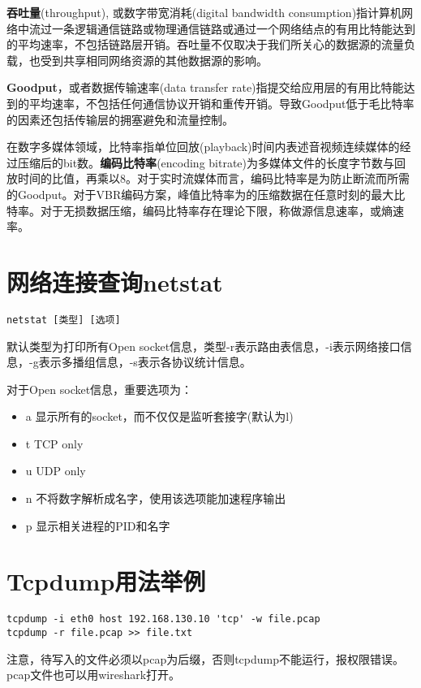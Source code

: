 \textbf{吞吐量}(throughput), 或数字带宽消耗(digital bandwidth consumption)指计算机网络中流过一条逻辑通信链路或物理通信链路或通过一个网络结点的有用比特能达到的平均速率，不包括链路层开销。吞吐量不仅取决于我们所关心的数据源的流量负载，也受到共享相同网络资源的其他数据源的影响。

\textbf{Goodput}，或者数据传输速率(data transfer rate)指提交给应用层的有用比特能达到的平均速率，不包括任何通信协议开销和重传开销。导致Goodput低于毛比特率的因素还包括传输层的拥塞避免和流量控制。

在数字多媒体领域，比特率指单位回放(playback)时间内表述音视频连续媒体的经过压缩后的bit数。\textbf{编码比特率}(encoding bitrate)为多媒体文件的长度字节数与回放时间的比值，再乘以8。对于实时流媒体而言，编码比特率是为防止断流而所需的Goodput。对于VBR编码方案，峰值比特率为的压缩数据在任意时刻的最大比特率。对于无损数据压缩，编码比特率存在理论下限，称做源信息速率，或熵速率。






\section{网络连接查询netstat}

\label{nettool:netstat}

\begin{verbatim}
netstat [类型] [选项]
\end{verbatim}
默认类型为打印所有Open socket信息，类型-r表示路由表信息，-i表示网络接口信息，-g表示多播组信息，-s表示各协议统计信息。

对于Open socket信息，重要选项为：
\begin{itemize}
    \item 
a 显示所有的socket，而不仅仅是监听套接字(默认为l)
    \item 
t TCP only
    \item 
u UDP only
    \item 
n 不将数字解析成名字，使用该选项能加速程序输出
    \item 
p 显示相关进程的PID和名字
\end{itemize}


\section{Tcpdump用法举例}

\begin{verbatim}
tcpdump -i eth0 host 192.168.130.10 'tcp' -w file.pcap
tcpdump -r file.pcap >> file.txt
\end{verbatim}
注意，待写入的文件必须以pcap为后缀，否则tcpdump不能运行，报权限错误。pcap文件也可以用wireshark打开。

